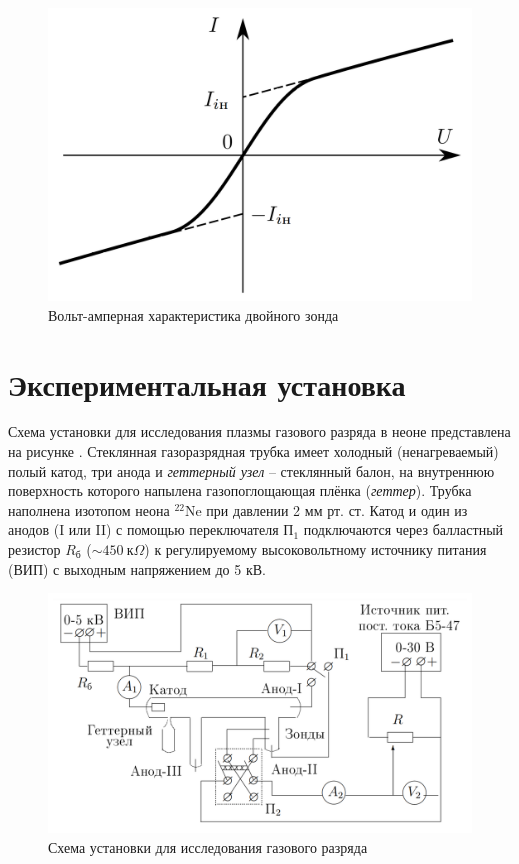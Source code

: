 \documentclass[a4paper,10pt]{article}
\begin{document}
\begin{figure}[h]
	\centering
	\includegraphics[scale=0.30]{Tok}
	\caption{Вольт-амперная характеристика двойного зонда} \label{Tok}
\end{figure}

\section*{Экспериментальная установка}

Схема установки для исследования плазмы газового разряда в неоне представлена на рисунке . Стеклянная газоразрядная трубка имеет холодный (ненагреваемый) полый катод, три анода и \textit{геттерный узел} -- стеклянный балон, на внутреннюю поверхность которого напылена газопоглощающая плёнка (\textit{геттер}). Трубка наполнена изотопом неона ${}^{22}\text{Ne}$ при давлении 2 мм рт. ст. Катод и один из анодов (I или II) с помощью переключателя $\text{П}_1$ подключаются через балластный резистор $R_{\text{б}}$ ($\sim450~\text{к}\Omega$) к регулируемому высоковольтному источнику питания (ВИП) с выходным напряжением до 5 кВ.

\begin{figure}[h]
	\centering
	\includegraphics[scale=0.30]{Device}
	\caption{Схема установки для исследования газового разряда} \label{Device}
\end{figure}
\end{document}
